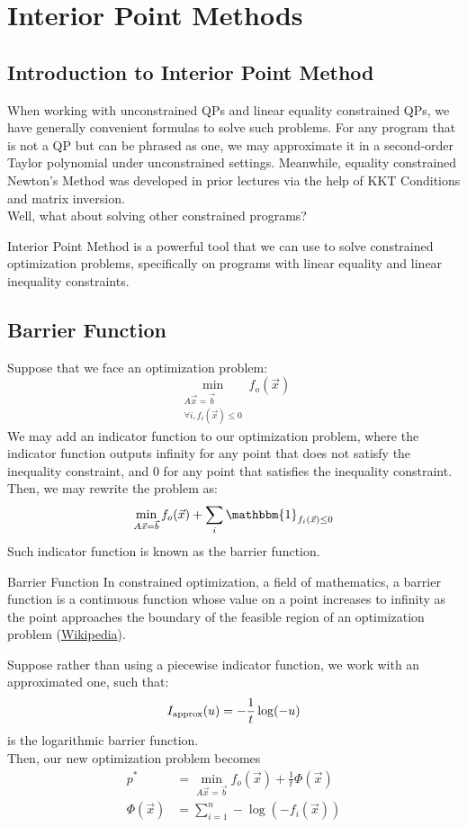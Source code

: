 \chapter{Interior Point Methods}

\section{Introduction to Interior Point Method}
When working with unconstrained QPs and linear equality constrained QPs, we have generally convenient formulas to solve such problems.
For any program that is not a QP but can be phrased as one, we may approximate it in a second-order Taylor polynomial under unconstrained settings.
Meanwhile, equality constrained Newton's Method was developed in prior lectures via the help of KKT Conditions and matrix inversion. \\
Well, what about solving other constrained programs?

Interior Point Method is a powerful tool that we can use to solve constrained optimization problems, specifically on programs with linear equality and linear inequality constraints. \\

\section{Barrier Function}
Suppose that we face an optimization problem:
\[
    \min_{
        \substack{
            A \vec{x} = \vec{b} \\
            \forall i, f_i(\vec{x}) \leq 0
        }
    } f_o (\vec{x})
\]
We may add an indicator function to our optimization problem, where the indicator function outputs infinity for any point that does not satisfy the inequality constraint, and $0$ for any point that satisfies the inequality constraint. \\
Then, we may rewrite the problem as:
\[
    \min_{
        A \vec{x} = \vec{b}
    } f_o (\vec{x}) + \sum_i \mathbbm{1}_{f_i(\vec{x}) \leq 0}
\]
Such indicator function is known as the barrier function.
\begin{ln-define}{Barrier Function}{}
    In constrained optimization, a field of mathematics, a barrier function is a continuous function whose value on a point increases to infinity as the point approaches the boundary of the feasible region of an optimization problem
    (\href{https://en.wikipedia.org/wiki/Barrier_function}{Wikipedia}).
\end{ln-define}
Suppose rather than using a piecewise indicator function, we work with an approximated one, such that:
\[
    I_{\rm approx} (u) = -\frac{1}{t} \log(-u)
\]
is the logarithmic barrier function. \\
Then, our new optimization problem becomes
\begin{align*}
    p^* &= \min_{
        A \vec{x} = \vec{b}
    } f_o (\vec{x}) + \frac{1}{t} \Phi(\vec{x}) \\
    \Phi(\vec{x}) &= \sum_{i = 1}^n -\log(-f_i(\vec{x}))
\end{align*}
